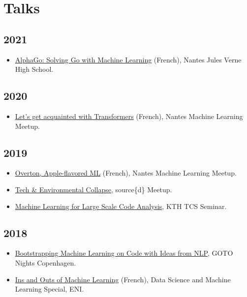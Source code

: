 \documentclass[11pt,a4paper]{moderncv}
\begin{document}
\section{Talks}

\subsection{2021}

\begin{itemize}
\item
  \href{https://github.com/m09/decks/blob/main/2016-03-alphago/jules-verne.html}{AlphaGo: Solving Go with Machine Learning} (French),
  Nantes Jules Verne High School.
\end{itemize}

\subsection{2020}

\begin{itemize}
\item
  \href{https://www.meetup.com/nantes-machine-learning-meetup/events/268243136/}{Let's get acquainted with Transformers} (French),
  Nantes Machine Learning Meetup.
\end{itemize}

\subsection{2019}

\begin{itemize}
\item
  \href{https://www.meetup.com/Nantes-Machine-Learning-Meetup/events/265265431/}{Overton,
    Apple-flavored ML} (French), Nantes Machine Learning Meetup.
\item
  \href{https://www.eventbrite.com/e/tech-environmental-collapse-tickets-57986002695}{Tech
    \& Environmental Collapse}, source\{d\} Meetup.
\item \href{https://github.com/m09/talks/tree/master/kth}{Machine
    Learning for Large Scale Code Analysis}, KTH TCS Seminar.
\end{itemize}

\subsection{2018}

\begin{itemize}
\item
  \href{https://www.meetup.com/GOTO-Nights-CPH/events/256342503/}{Bootstrapping
    Machine Learning on Code with Ideas from NLP}, GOTO Nights
  Copenhagen.
\item
  \href{https://www.mapado.com/nantes/la-matinale-de-la-data-science-et-du-machine-learning}{Ins
    and Outs of Machine Learning} (French), Data Science and
  Machine Learning Special, ENI.
\end{itemize}
\end{document}
